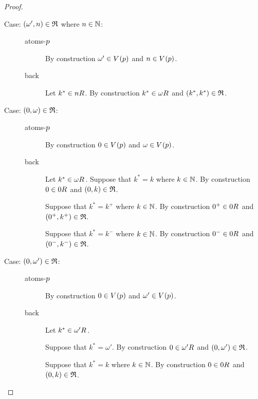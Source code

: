 \begin{proof}
\begin{description}
\begin{description}
        \end{description}
    \item[Case: $(\omega', n) \in \mathfrak{R}$ where $n \in \mathbb{N}$:]\hfill
        \begin{description}
            \item[atoms-$p$]
                By construction $\omega' \in \kValuation(\atomP)$ and $n \in \kValuation(\atomP)$.
            \item[back]
                Let $k^* \in \kSuccessors{}{n}$.
                By construction $k^* \in \kSuccessors{}{\omega}$ and $(k^*, k^*) \in \mathfrak{R}$.
        \end{description}
    \item[Case: $(0, \omega) \in \mathfrak{R}$:]\hfill
        \begin{description}
            \item[atoms-$p$]
                By construction $0 \in \kValuation(\atomP)$ and $\omega \in \kValuation(\atomP)$.
            \item[back]
                Let $k^* \in \kSuccessors{}{\omega}$.
                Suppose that $k^* = k$ where $k \in \mathbb{N}$.
                By construction $0 \in \kSuccessors{}{0}$ and $(0, k) \in \mathfrak{R}$.

                Suppose that $k^* = k^+$ where $k \in \mathbb{N}$.
                By construction $0^+ \in \kSuccessors{}{0}$ and $(0^+, k^+) \in \mathfrak{R}$.

                Suppose that $k^* = k^-$ where $k \in \mathbb{N}$.
                By construction $0^- \in \kSuccessors{}{0}$ and $(0^-, k^-) \in \mathfrak{R}$.
        \end{description}
    \item[Case: $(0, \omega') \in \mathfrak{R}$:]\hfill
        \begin{description}
            \item[atoms-$p$]
                By construction $0 \in \kValuation(\atomP)$ and $\omega' \in \kValuation(\atomP)$.
            \item[back]
                Let $k^* \in \kSuccessors{}{\omega'}$.

                Suppose that $k^* = \omega'$.
                By construction $0 \in \kSuccessors{}{\omega'}$ and $(0, \omega') \in \mathfrak{R}$.

                Suppose that $k^* = k$ where $k \in \mathbb{N}$.
                By construction $0 \in \kSuccessors{}{0}$ and $(0, k) \in \mathfrak{R}$.


\end{description}
\end{description}
\end{proof}
